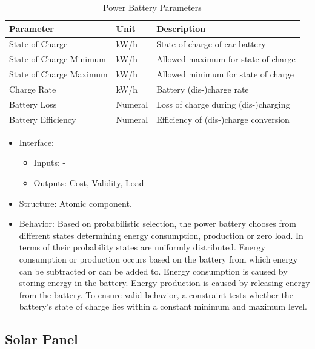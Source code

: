 \begin{table}[h]
	\renewcommand{\arraystretch}{1.3}
	\caption{Power Battery Parameters}
	\centering
	\begin{tabular}{lll}
		\hline
		\textbf{Parameter}                    & \textbf{Unit} & \textbf{Description} \\ \hline
		State of Charge                       & kW/h          & State of charge of car battery                     \\
		State of Charge Minimum               & kW/h          & Allowed maximum for state of charge                    \\
		State of Charge Maximum               & kW/h          & Allowed minimum for state of charge                     \\
		Charge Rate                  	  	  & kW/h    	  & Battery (dis-)charge rate     \\ 
		Battery Loss                  	  	  & Numeral    	  & Loss of charge during (dis-)charging \\
		Battery Efficiency                    & Numeral    	  & Efficiency of (dis-)charge conversion     \\ \hline
	\end{tabular}
\end{table}

\begin{itemize}
	\item Interface: 
	\begin{itemize}
		\item Inputs: -
		\item Outputs: Cost, Validity, Load
	\end{itemize}	
	\item Structure: Atomic component.
	\item Behavior: 
	Based on probabilistic selection, the power battery chooses from different states determining energy consumption, production or zero load. In terms of their probability states are uniformly distributed.
	Energy consumption or production occurs based on the battery from which energy can be subtracted or can be added to. Energy consumption is caused by storing energy in the battery. Energy production is caused by releasing energy from the battery. To ensure valid behavior, a constraint tests whether the battery's state of charge lies within a constant minimum and maximum level.
\end{itemize}

\subsection{Solar Panel}


